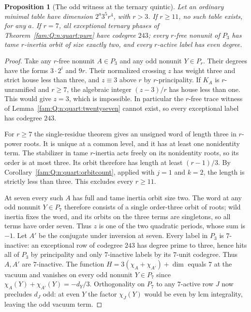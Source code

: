\documentclass[11pt,a4paper]{article}
\numberwithin{equation}{section}
\newtheorem{proposition}[theorem]{Proposition}
\theoremstyle{remark}
\begin{document}
\begin{proposition}[The odd witness at the ternary quintic]\label{fam:Q:6.8}
Let an ordinary minimal table have dimension $2^a3^5r^4$, with
$r>3$. If $r\ge11$, no such table exists, for any $a$.
If $r=7$, all exceptional ternary phases of
Theorem~\ref{fam:Q:n:quart:pure} have codegree $243$; every $r$-free
nonunit of $P_3$ has tame $r$-inertia orbit of size exactly two,
and every $r$-active label has even degree.
\end{proposition}
\begin{proof}
Take any $r$-free nonunit $A\in P_3$ and any odd nonunit
$Y\in P_r$. Their degrees have the forms $3\cdot2^i$ and
$9r$. Their normalized crossing $z$ has weight three and
strict house less than three, and $z\equiv3$ above $r$ by
$r$-principality. If $K_A$ is $r$-unramified and $r\ge7$,
the algebraic integer $(z-3)/r$ has house less than one.
This would give $z=3$, which is impossible. In particular the
$r$-free trace witness of Lemma~\ref{fam:Q:n:quart:twentyseven} cannot
exist, so every exceptional label has codegree $243$.

For $r\ge7$ the single-residue theorem gives an unsigned word
of length three in $r$-power roots. It is unique at a common
level, and it has at least one nonidentity term. The stabilizer
in tame $r$-inertia acts freely on its nonidentity roots, so
its order is at most three. Its orbit therefore has length at least $(r-1)/3$.
By Corollary~\ref{fam:Q:n:quart:orbitcount}, applied with $j=1$ and $k=2$,
the length is strictly less than three.
This excludes every $r\ge11$.

At seven every such $A$ has full and tame inertia orbit size
two. The word at any odd nonunit $Y\in P_7$ therefore consists
of a single order-three orbit of roots; wild inertia fixes
the word, and its orbits on the three terms are singletons,
so all terms have order seven. Thus $z$ is one of the two
quadratic periods, whose sum is $-1$. Let $A'$ be the conjugate
under inversion at seven. Every label in $P_3$ is $7$-inactive:
an exceptional row of codegree $243$ has degree prime to three,
hence hits all of $P_3$ by principality and only $7$-inactive
labels by its $7$-unit codegree. Thus $A,A'$ are $7$-inactive.
The function $H=3(\chi_A+\chi_{A'})+\dim$ equals $7$ at the
vacuum and vanishes on every odd nonunit $Y\in P_7$ since
$\chi_A(Y)+\chi_{A'}(Y)=-d_Y/3$. Orthogonality on $P_7$ to
any $7$-active row $J$ now precludes $d_J$ odd: at even
$Y$ the factor $\chi_J(Y)$ would be even by lcm integrality,
leaving the odd vacuum term.
\end{proof}
\end{document}
